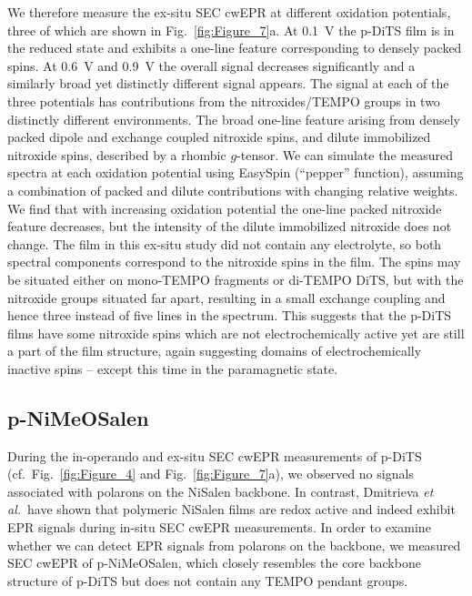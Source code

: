 \par
We therefore measure the ex-situ SEC cwEPR at different oxidation potentials, three of which are shown in Fig.~\ref{fig:Figure_7}a. At 0.1~V the p-DiTS film is in the reduced state and exhibits a one-line feature corresponding to densely packed spins. At 0.6~V and 0.9~V the overall signal decreases significantly and a similarly broad yet distinctly different signal appears. The signal at each of the three potentials has contributions from the nitroxides/TEMPO groups in two distinctly different environments. The broad one-line feature arising from densely packed dipole and exchange coupled nitroxide spins, and dilute immobilized nitroxide spins, described by a rhombic $g$-tensor. We can simulate the measured spectra at each oxidation potential using EasySpin \cite{Stoll2006} (``pepper'' function), assuming a combination of packed and dilute contributions with changing relative weights. We find that with increasing oxidation potential the one-line packed nitroxide feature decreases, but the intensity of the dilute immobilized nitroxide does not change. The film in this ex-situ study did not contain any electrolyte, so both spectral components correspond to the nitroxide spins in the film. The spins may be situated either on mono-TEMPO fragments or di-TEMPO DiTS, but with the nitroxide groups situated far apart, resulting in a small exchange coupling and hence three instead of five lines in the spectrum. This suggests that the p-DiTS films have some nitroxide spins which are not electrochemically active yet are still a part of the film structure, again suggesting domains of electrochemically inactive spins -- except this time in the paramagnetic state.

\subsection{p-NiMeOSalen} \label{Section:ex-situ_pNiMeOS}
\label{subs:nimeos}
%
During the in-operando and ex-situ SEC cwEPR measurements of p-DiTS (cf.\ Fig.~\ref{fig:Figure_4} and Fig.~\ref{fig:Figure_7}a), we observed no signals associated with polarons on the NiSalen backbone. In contrast, Dmitrieva \textit{et al.}\ have shown that polymeric NiSalen films are redox active and indeed exhibit EPR signals during in-situ SEC cwEPR measurements.\cite{Dmitrieva2018} In order to examine whether we can detect EPR signals from polarons on the backbone, we measured SEC cwEPR of p-NiMeOSalen, which closely resembles the core backbone structure of p-DiTS but does not contain any TEMPO pendant groups.
\par

